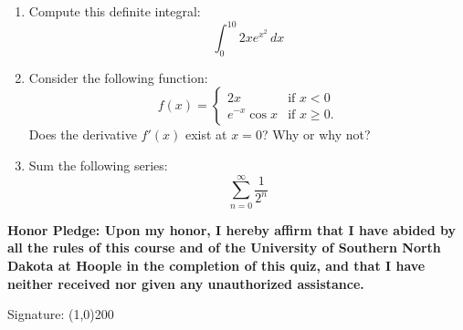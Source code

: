 \documentclass[12pt]{article}
\begin{document}
\begin{enumerate}
\item Compute this definite integral:
\begin{equation*}
\int_0^{10} 2x e^{x^2}\, dx
\end{equation*}
\vspace{1.25in}

\item Consider the following function:
\begin{equation*}
f(x) = \begin{cases}
2x & \text{if } x<0 \\
e^{-x}\cos x & \text{if } x \geq 0.
\end{cases}
\end{equation*}
Does the derivative $f'(x)$ exist at $x=0$? Why or why not?
\vspace{0.75in}

\item Sum the following series:
\begin{equation*}
  \sum_{n=0}^\infty \frac{1}{2^n}
\end{equation*}
\vspace{0.75in}
\end{enumerate}



\textbf{Honor Pledge: Upon my honor, I hereby affirm that I have
  abided by all the rules of this course and of the University of
  Southern North Dakota at Hoople in the completion of this quiz, and
  that I have neither received nor given any unauthorized assistance.}
\vspace{0.2in}

Signature: \line(1,0){200}
\end{document}
